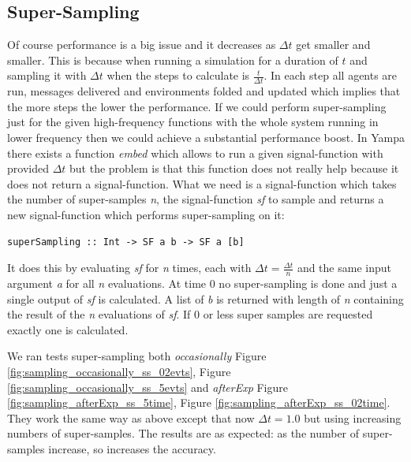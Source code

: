 \subsection*{Super-Sampling}
Of course performance is a big issue and it decreases as $\Delta t$ get smaller and smaller. This is because when running a simulation for a duration of $t$ and sampling it with $\Delta t$ when the steps to calculate is $\frac{t}{\Delta t}$. In each step all agents are run, messages delivered and environments folded and updated which implies that the more steps the lower the performance. If we could perform super-sampling just for the given high-frequency functions with the whole system running in lower frequency then we could achieve a substantial performance boost. In Yampa there exists a function \textit{embed} which allows to run a given signal-function with provided $\Delta t$ but the problem is that this function does not really help because it does not return a signal-function. What we need is a signal-function which takes the number of super-samples \textit{n}, the signal-function \textit{sf} to sample and returns a new signal-function which performs super-sampling on it:

\begin{verbatim}
superSampling :: Int -> SF a b -> SF a [b]
\end{verbatim}

It does this by evaluating \textit{sf} for \textit{n} times, each with $\Delta t = \frac{\Delta t}{n}$ and the same input argument \textit{a} for all \textit{n} evaluations. At time 0 no super-sampling is done and just a single output of \textit{sf} is calculated. A list of \textit{b} is returned with length of \textit{n} containing the result of the \textit{n} evaluations of \textit{sf}. If 0 or less super samples are requested exactly one is calculated.

We ran tests super-sampling both \textit{occasionally} Figure \ref{fig:sampling_occasionally_ss_02evts}, Figure \ref{fig:sampling_occasionally_ss_5evts} and \textit{afterExp} Figure \ref{fig:sampling_afterExp_ss_5time}, Figure \ref{fig:sampling_afterExp_ss_02time}. They work the same way as above except that now $\Delta t = 1.0$ but using increasing numbers of super-samples. The results are as expected: as the number of super-samples increase, so increases the accuracy.

